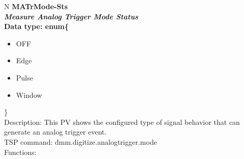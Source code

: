 \documentclass[openany]{article}
\begin{document}
		\begin{tabular}{N}
			\hline
			\bfseries MATrMode-Sts\label{pv:matrmode-sts} \\ \hline
			\emph{Measure Analog Trigger Mode Status} \\
			Data type: enum\{\begin{itemize}[noitemsep]
				\small
				\item[] OFF
				\item[] Edge
				\item[] Pulse
				\item[] Window
			\end{itemize}\} \\
			Description: This PV shows the configured type of signal behavior that can generate an analog trigger event. \\
			TSP command: dmm.digitize.analogtrigger.mode \\
			Functions: \\
			\arrayrulecolor{\FuncTableBorderColor}

		\end{tabular}
\end{document}
